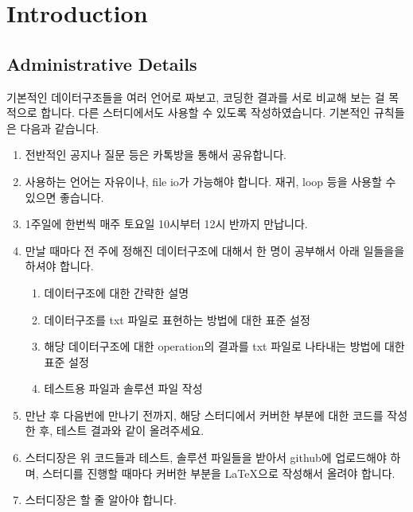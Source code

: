 \section{Introduction}

\subsection{Administrative Details}

기본적인 데이터구조들을 여러 언어로 짜보고, 코딩한 결과를 서로 비교해 보는 걸 목적으로 합니다. 다른 스터디에서도 사용할 수 있도록 작성하였습니다. 기본적인 규칙들은 다음과 같습니다. 

\begin{enumerate}

\item 전반적인 공지나 질문 등은 카톡방을 통해서 공유합니다. 
\item 사용하는 언어는 자유이나, file io가 가능해야 합니다. 재귀, loop 등을 사용할 수 있으면 좋습니다. 

\item 1주일에 한번씩 매주 토요일 10시부터 12시 반까지 만납니다. 

\item 만날 때마다 전 주에 정해진 데이터구조에 대해서 한 명이 공부해서 아래 일들을을 하셔야 합니다.

\begin{enumerate}
\item 데이터구조에 대한 간략한 설명 
\item 데이터구조를 txt 파일로 표현하는 방법에 대한 표준 설정 
\item 해당 데이터구조에 대한 operation의 결과를 txt 파일로 나타내는 방법에 대한 표준 설정 
\item 테스트용 파일과 솔루션 파일 작성
\end{enumerate}

\item 만난 후 다음번에 만나기 전까지, 해당 스터디에서 커버한 부분에 대한 코드를 작성한 후, 테스트 결과와 같이 올려주세요. 

\item 스터디장은 위 코드들과 테스트, 솔루션 파일들을 받아서 github에 업로드해야 하며, 스터디를 진행할 때마다 커버한 부분을 \LaTeX 으로 작성해서 올려야 합니다. 

\item 스터디장은  할 줄 알아야 합니다. 

\end{enumerate}

